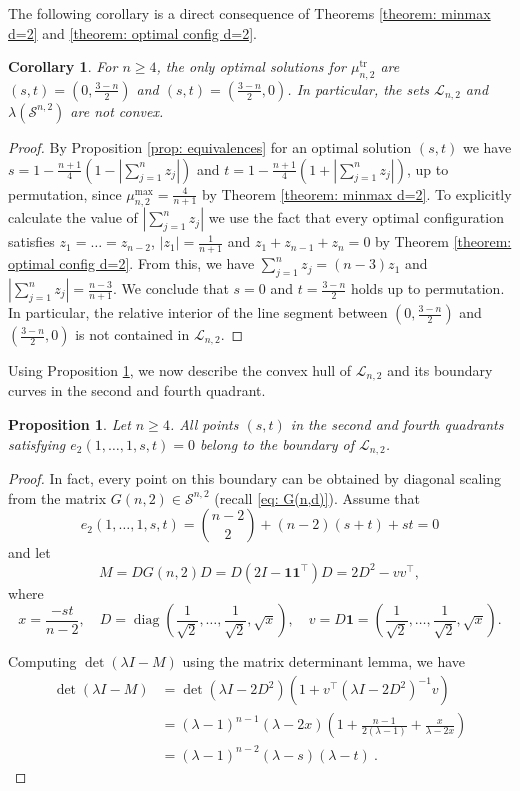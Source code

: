 \documentclass[reqno,hidelinks,11pt]{amsart}
\numberwithin{equation}{section}
\newtheorem{corollary}[theorem]{Corollary}
\newtheorem{proposition}[theorem]{Proposition}
\def\diag{\operatorname{diag}}
\def\S{\mathcal{S}}
\begin{document}
The following corollary is a direct consequence of Theorems \ref{theorem: minmax d=2} and \ref{theorem: optimal config d=2}.

\begin{corollary}\label{corollary: nonconvexity}
    For $n \geq 4$, the only optimal solutions for $\mu_{n,2}^{\operatorname{tr}}$ are $(s, t)=(0, \frac{3-n}{2})$ and $(s, t)=(\frac{3-n}{2},0)$. In particular, the sets $\mathcal{L}_{n, 2}$ and $\lambda(\S^{n,2})$ are not convex.
\end{corollary}
\begin{proof}
By Proposition \ref{prop: equivalences} for an optimal solution $(s,t)$ we have $s=1-\frac{n+1}{4}(1-|\sum_{j=1}^n z_j|)$ and $t=1-\frac{n+1}{4}(1+|\sum_{j=1}^n z_j|)$,
up to permutation, since $\mu_{n,2}^{\max}=\frac{4}{n+1}$ by Theorem \ref{theorem: minmax d=2}. 
To explicitly calculate the value of $|\sum_{j=1}^n z_j |$ we use the fact that every optimal configuration satisfies $z_1= \dots = z_{n-2}$, $|z_1|=\frac{1}{n+1}$ and $z_1+z_{n-1}+z_n=0$ by Theorem \ref{theorem: optimal config d=2}. From this, we have $\sum_{j=1}^n z_j = (n-3)z_1$ and $| \sum_{j=1}^n z_j | = \frac{n-3}{n+1}$. We conclude that $s=0$ and $t=\frac{3-n}{2}$ holds up to permutation. 
In particular, the relative interior of the line segment between $(0,\frac{3-n}{2})$ and $(\frac{3-n}{2},0)$ is not contained in $\mathcal{L}_{n, 2}$. 
\end{proof}

Using Proposition \ref{prop: 2nd 4th quadrant}, we now describe the convex hull of $\mathcal{L}_{n,2}$ and its boundary curves in the second and fourth quadrant.

\begin{proposition}\label{prop: 2nd 4th quadrant}
Let $n \geq 4$. All points $(s,t)$ in the second and fourth quadrants satisfying $e_2(1,\dots,1,s,t)=0$ belong to the boundary of $\mathcal{L}_{n,2}$.
\end{proposition}
\begin{proof}
In fact, every point on this boundary can be obtained by diagonal scaling from the matrix $G(n, 2) \in \S^{n, 2}$ (recall \eqref{eq: G(n,d)}).
Assume that 
\[
e_2(1,\dots,1,s,t) = \binom{n-2}2+(n-2)(s+t)+st=0
\]
and let 
\[M= DG(n, 2)D = D(2I - \mathbf{1}\mathbf{1}^\top)D = 2D^2-vv^\top,\] 
where 
\[
x=\frac{-st}{n-2}, \quad D=\diag\left(\frac{1}{\sqrt{2}},\ldots, \frac{1}{\sqrt{2}}, \sqrt{x}\right), \quad v=D\mathbf{1}=\left(\frac{1}{\sqrt{2}}, \ldots, \frac{1}{\sqrt{2}}, \sqrt{x}\right).
\]

Computing $\det(\lambda I-M)$ using the matrix determinant lemma, we have 
\begin{align*}
    \det(\lambda I-M)&=\det(\lambda I-2D^2)(1+v^\top(\lambda I-2D^2)^{-1}v)\\
    &=(\lambda-1)^{n-1}(\lambda-2x)\left(1+\frac{n-1}{2(\lambda-1)}+\frac{x}{\lambda-2x}\right)\\
    &=(\lambda-1)^{n-2}(\lambda-s)(\lambda-t)~.
\end{align*}
\end{proof}
\end{document}
